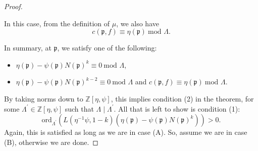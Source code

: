 \documentclass[a4paper,oneside]{amsart}
\theoremstyle{plain}
\theoremstyle{definition}
\begin{document}
\begin{proof}
\begin{itemize}
        In this case, from the definition of $\mu$, we also have
        \begin{equation*}
            c(\mathfrak{p},f) \equiv \eta(\mathfrak{p}) \ \text{mod } \Lambda.
        \end{equation*}
    \end{itemize}
    In summary, at $\mathfrak{p}$, we satisfy one of the following:
    \begin{itemize}
        \item[(A)] $\eta(\mathfrak{p}) - \psi(\mathfrak{p})N(\mathfrak{p})^{k} \equiv 0 \ \text{mod } \Lambda$,
        \item[(B)] $\eta(\mathfrak{p}) - \psi(\mathfrak{p})N(\mathfrak{p})^{k-2} \equiv 0 \ \text{mod } \Lambda$ and $c(\mathfrak{p},f) \equiv \eta(\mathfrak{p}) \ \text{mod } \Lambda.$
    \end{itemize}
    By taking norms down to $\mathbb{Z}[\eta, \psi]$, this implies condition (2) in the theorem, for some $\Lambda^\prime \in \mathbb{Z}[\eta, \psi]$ such that $\Lambda \mid \Lambda^\prime$. All that is left to show is condition (1):
    \begin{equation*}
        \text{ord}_{\Lambda^\prime}(L(\eta^{-1}\psi, 1-k)(\eta(\mathfrak{p})-\psi(\mathfrak{p})N(\mathfrak{p})^k)) > 0.
    \end{equation*}
    Again, this is satisfied as long as we are in case (A). So, assume we are in case (B), otherwise we are done.


\end{proof}
\end{document}
